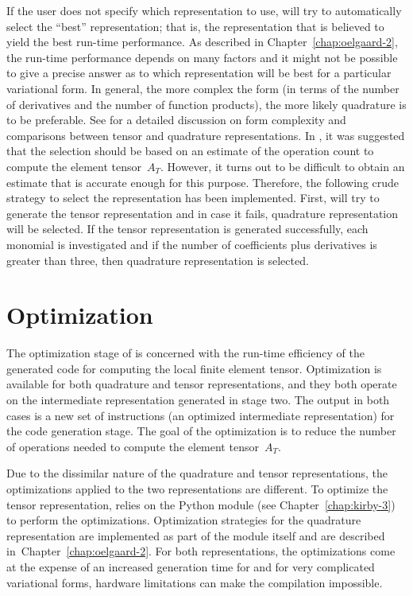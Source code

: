 If the user does not specify which representation to use, \ffc{} will
try to automatically select the ``best'' representation; that is, the
representation that is believed to yield the best run-time
performance. As described in Chapter~\ref{chap:oelgaard-2}, the
run-time performance depends on many factors and it might not be
possible to give a precise \apriori{} answer as to which
representation will be best for a particular variational form. In
general, the more complex the form (in terms of the number of
derivatives and the number of function products), the more likely
quadrature is to be preferable. See \citet{OelgaardWells2010} for a
detailed discussion on form complexity and comparisons between tensor
and quadrature representations. In \citet{OelgaardWells2010}, it was
suggested that the selection should be based on an estimate of the
operation count to compute the element tensor~$A_T$.  However, it
turns out to be difficult to obtain an estimate that is accurate
enough for this purpose. Therefore, the following crude strategy to
select the representation has been implemented. First, \ffc{} will try
to generate the tensor representation and in case it fails, quadrature
representation will be selected. If the tensor representation is
generated successfully, each monomial is investigated and if the
number of coefficients plus derivatives is greater than three, then
quadrature representation is selected.


\section{Optimization}

The optimization stage of \ffc{} is concerned with the run-time
efficiency of the generated code for computing the local finite
element tensor. Optimization is available for both quadrature and
tensor representations, and they both operate on the intermediate
representation generated in stage two. The output in both cases is a
new set of instructions (an optimized intermediate representation) for
the code generation stage. The goal of the optimization is to reduce
the number of operations needed to compute the element tensor~$A_T$.

Due to the dissimilar nature of the quadrature and tensor representations,
the optimizations applied to the two representations are different.
To optimize the tensor representation, \ffc{} relies on the Python
module \ferari{} (see Chapter~\ref{chap:kirby-3}) to perform the
optimizations. Optimization strategies for the quadrature representation
are implemented as part of the \ffc{} module itself and are described
in~Chapter~\ref{chap:oelgaard-2}.  For both representations, the
optimizations come at the expense of an increased generation time for
\ffc{} and for very complicated variational forms, hardware limitations
can make the compilation impossible.

